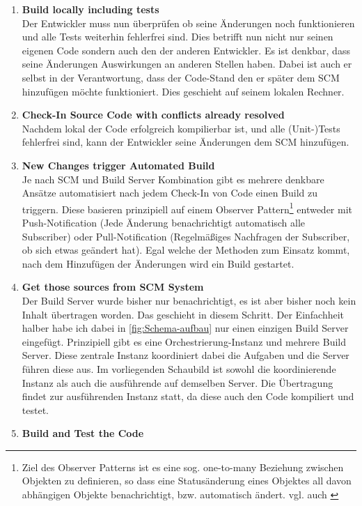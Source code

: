 \begin{enumerate}
		\item \textbf{Build locally including tests}\\%
		Der Entwickler muss nun überprüfen ob seine Änderungen noch funktionieren und alle Tests weiterhin fehlerfrei sind. Dies betrifft nun nicht nur seinen eigenen Code sondern auch den der anderen Entwickler. Es ist denkbar, dass seine Änderungen Auswirkungen an anderen Stellen haben. Dabei ist auch er selbst in der Verantwortung, dass der Code-Stand den er später dem SCM hinzufügen möchte funktioniert. Dies geschieht auf seinem lokalen Rechner.		
		\item \textbf{Check-In Source Code with conflicts already resolved}\\%
		Nachdem lokal der Code erfolgreich kompilierbar ist, und alle (Unit-)Tests fehlerfrei sind, kann der Entwickler seine Änderungen dem SCM hinzufügen.
		\item \textbf{New Changes trigger Automated Build}\\%
		Je nach SCM und Build Server Kombination gibt es mehrere denkbare Ansätze automatisiert nach jedem Check-In von Code einen Build zu triggern. Diese basieren prinzipiell auf einem Observer Pattern\footnote{Ziel des Observer Patterns ist es eine sog. one-to-many Beziehung zwischen Objekten zu definieren, so dass eine Statusänderung eines Objektes all davon abhängigen Objekte benachrichtigt, bzw. automatisch ändert. vgl. auch \cite{hannemann2002design}} entweder mit Push-Notification (Jede Änderung benachrichtigt automatisch alle Subscriber) oder Pull-Notification (Regelmäßiges Nachfragen der Subscriber, ob sich etwas geändert hat). Egal welche der Methoden zum Einsatz kommt, nach dem Hinzufügen der Änderungen wird ein Build gestartet.
		\item \textbf{Get those sources from SCM System}\\%
		Der Build Server wurde bisher nur benachrichtigt, es ist aber bisher noch kein Inhalt übertragen worden. Das geschieht in diesem Schritt. Der Einfachheit halber habe ich dabei in \autoref{fig:Schema-aufbau} nur einen einzigen Build Server eingefügt. Prinzipiell gibt es eine Orchestrierung-Instanz und mehrere Build Server. Diese zentrale Instanz koordiniert dabei die Aufgaben und die Server führen diese aus. Im vorliegenden Schaubild ist sowohl die koordinierende Instanz als auch die ausführende auf demselben Server. Die Übertragung findet zur ausführenden Instanz statt, da diese auch den Code kompiliert und testet.
		\item \textbf{Build and Test the Code}\\%

\end{enumerate}
